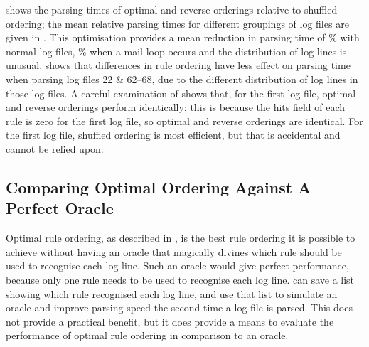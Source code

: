  shows the
parsing times of optimal and reverse orderings relative to shuffled
ordering; the mean relative parsing times for different groupings of log
files are given in .  This optimisation provides a mean reduction in parsing time of
\%
with normal log files,
\%
when a mail loop occurs and the distribution of log lines is unusual.
 shows that
differences in rule ordering have less effect on parsing time when parsing
log files 22 \& 62--68, due to the different distribution of log lines in
those log files.  A careful examination of  shows that, for the first log file, optimal and
reverse orderings perform identically: this is because the hits field of
each rule is zero for the first log file, so optimal and reverse orderings
are identical.  For the first log file, shuffled ordering is most
efficient, but that is accidental and cannot be relied upon.




\FloatBarrier{}

\subsection{Comparing Optimal Ordering Against A Perfect Oracle}

\label{perfect rule ordering}

Optimal rule ordering, as described in , is the best rule ordering it is possible to achieve without
having an oracle that magically divines which rule should be used to
recognise each log line.  Such an oracle would give perfect performance,
because only one rule needs to be used to recognise each log line.
\parsername{} can save a list showing which rule recognised each log line,
and use that list to simulate an oracle and improve parsing speed the
second time a log file is parsed.  This does not provide a practical
benefit, but it does provide a means to evaluate the performance of optimal
rule ordering in comparison to an oracle.

